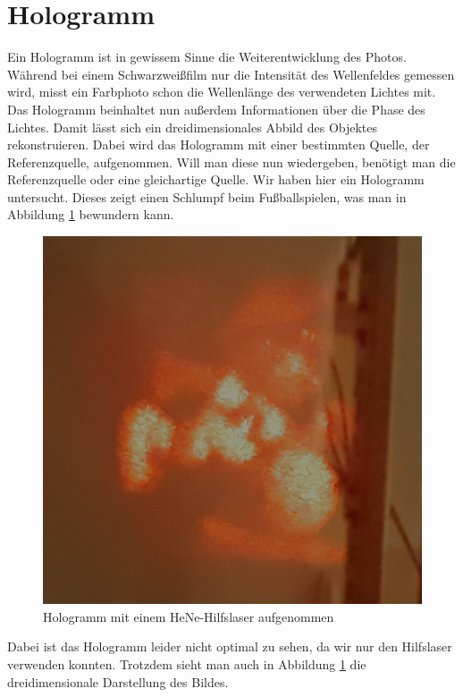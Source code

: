 \section{Hologramm}

Ein Hologramm ist in gewissem Sinne die Weiterentwicklung des Photos. Während bei einem Schwarzweißfilm nur die Intensität 
des Wellenfeldes gemessen wird, misst ein Farbphoto schon die Wellenlänge des verwendeten Lichtes mit. Das Hologramm 
beinhaltet nun außerdem Informationen über die Phase des Lichtes. Damit lässt sich ein dreidimensionales Abbild des 
Objektes rekonstruieren. Dabei wird das Hologramm mit einer bestimmten Quelle, der Referenzquelle, aufgenommen. Will man diese nun wiedergeben, benötigt man 
die Referenzquelle oder eine gleichartige Quelle. Wir haben hier ein Hologramm untersucht. Dieses zeigt einen Schlumpf 
beim Fußballspielen, was man in Abbildung \ref{bild:Holo} bewundern kann. 

\begin{figure}[ht]
    \centering
    \includegraphics[width = 12cm]{Bilder/Auswertung/Holo.png}
    \caption{Hologramm mit einem HeNe-Hilfslaser aufgenommen}
    \label{bild:Holo}
\end{figure}

Dabei ist das Hologramm leider nicht optimal zu sehen, da wir nur den Hilfslaser verwenden konnten. Trotzdem sieht
man auch in Abbildung \ref{bild:Holo} die dreidimensionale Darstellung des Bildes.